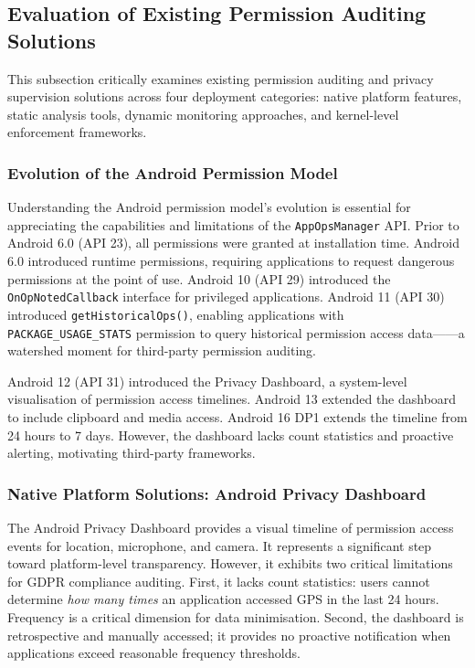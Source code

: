 \subsection{Evaluation of Existing Permission Auditing Solutions}

This subsection critically examines existing permission auditing and privacy supervision solutions across four deployment categories: native platform features, static analysis tools, dynamic monitoring approaches, and kernel-level enforcement frameworks.

\subsubsection{Evolution of the Android Permission Model}

Understanding the Android permission model's evolution is essential for appreciating the capabilities and limitations of the \texttt{AppOpsManager} API. Prior to Android 6.0 (API 23), all permissions were granted at installation time. Android 6.0 introduced runtime permissions, requiring applications to request dangerous permissions at the point of use. Android 10 (API 29) introduced the \texttt{OnOpNotedCallback} interface for privileged applications. Android 11 (API 30) introduced \texttt{getHistoricalOps()}, enabling applications with \texttt{PACKAGE\_USAGE\_STATS} permission to query historical permission access data——a watershed moment for third-party permission auditing.

Android 12 (API 31) introduced the Privacy Dashboard, a system-level visualisation of permission access timelines. Android 13 extended the dashboard to include clipboard and media access. Android 16 DP1 extends the timeline from 24 hours to 7 days. However, the dashboard lacks count statistics and proactive alerting, motivating third-party frameworks.

\subsubsection{Native Platform Solutions: Android Privacy Dashboard}

The Android Privacy Dashboard provides a visual timeline of permission access events for location, microphone, and camera. It represents a significant step toward platform-level transparency. However, it exhibits two critical limitations for GDPR compliance auditing. First, it lacks count statistics: users cannot determine \emph{how many times} an application accessed GPS in the last 24 hours. Frequency is a critical dimension for data minimisation. Second, the dashboard is retrospective and manually accessed; it provides no proactive notification when applications exceed reasonable frequency thresholds.

